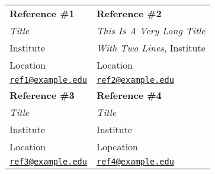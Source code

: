 \documentclass[letterpaper,11pt]{article}
\begin{document}
\begin{tabularx}{\textwidth}{@{}bb@{}}

		\textbf{Reference \#1} &  \textbf{Reference \#2}  \\
		\textit{Title} &  \textit{This Is A Very Long Title}  \\
		 Institute &   \textit{With Two Lines}, Institute  \\
		Location & Location \\
		\href{mailto:ref1@example.edu}{\texttt{ref1@example.edu}} &  \href{mailto:ref2@example.edu}{\texttt{ref2@example.edu}} \\[2ex]
		\textbf{Reference \#3} &  \textbf{Reference \#4}  \\
		\textit{Title} &  \textit{Title}  \\
		 Institute &  Institute  \\
		Location & Lopcation \\
		\href{mailto:ref3@example.edu}{\texttt{ref3@example.edu}} &  \href{mailto:ref4@example.edu}{\texttt{ref4@example.edu}} \\[2ex]
	
\end{tabularx}
\end{document}
